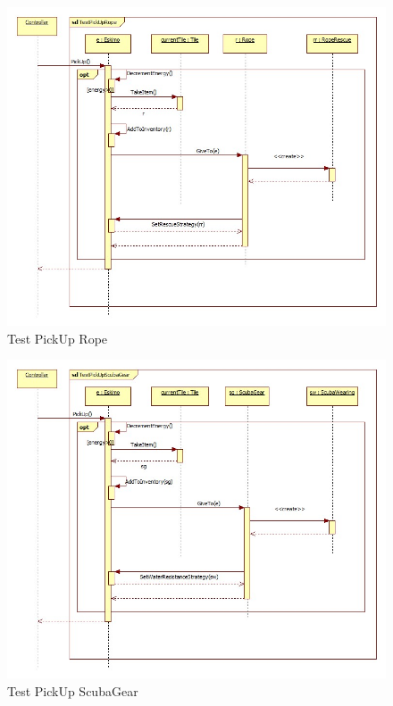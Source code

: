 \begin{figure}[h]
	\begin{center}
		\includegraphics[width=17cm]{chapters/chapter05/diagrams/TestPickUpRope.jpg}
		\caption{Test PickUp Rope}
		\label{fig:Test PickUp Rope}
	\end{center}
\end{figure}

\begin{figure}[h]
	\begin{center}
		\includegraphics[width=17cm]{chapters/chapter05/diagrams/TestPickUpScubaGear.jpg}
		\caption{Test PickUp ScubaGear}
		\label{fig:Test PickUp ScubaGear}
	\end{center}
\end{figure}

